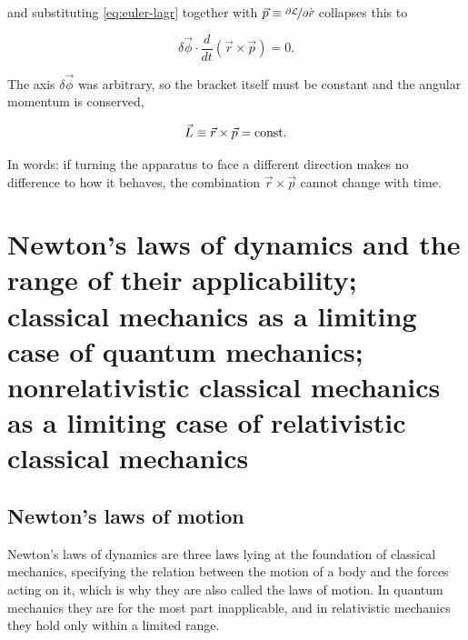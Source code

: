             and substituting \cref{eq:euler-lagr} together with $\vec{p} \equiv \nicefrac{\partial \mathcal{L}}{\partial \dot{\vec{r}}}$ collapses this to

            \begin{equation*}
                \delta\vec{\phi} \cdot \frac{d}{dt}\left( \vec{r} \times \vec{p} \right) = 0 .
            \end{equation*}

            The axis $\delta\vec{\phi}$ was arbitrary, so the bracket itself must be constant and the angular momentum is conserved,

            \begin{equation*}
                \vec{L} \equiv \vec{r} \times \vec{p} = \mathrm{const.}
            \end{equation*}

            In words: if turning the apparatus to face a different direction makes no difference to how it behaves, the combination $\vec{r} \times \vec{p}$ cannot change with time.

\section{Newton's laws of dynamics and the range of their applicability; classical mechanics as a limiting case of quantum mechanics; nonrelativistic classical mechanics as a limiting case of relativistic classical mechanics}
\label{sec:newton}

    \subsection{Newton's laws of motion}

    Newton's laws of dynamics are three laws lying at the foundation of classical mechanics, specifying the relation between the motion of a body and the forces acting on it, which is why they are also called the laws of motion. In quantum mechanics they are for the most part inapplicable, and in relativistic mechanics they hold only within a limited range.

